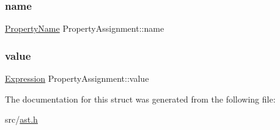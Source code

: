 \mbox{\label{struct_property_assignment_aef9a461cb355f88b21f339a613374bf0}} 
\subsubsection{\texorpdfstring{name}{name}}
{\footnotesize\ttfamily \hyperlink{ast_8h_a3a703c4a41dea6908048c9dd291d83b1}{Property\+Name} Property\+Assignment\+::name}

\mbox{\label{struct_property_assignment_ab246a5637430724d0532fc07d4f04462}} 
\subsubsection{\texorpdfstring{value}{value}}
{\footnotesize\ttfamily \hyperlink{ast_8h_a4cb273a4d960cd13ea17d08f254493e8}{Expression} Property\+Assignment\+::value}



The documentation for this struct was generated from the following file\+:\begin{DoxyCompactItemize}
\item 
src/\hyperlink{ast_8h}{ast.\+h}\end{DoxyCompactItemize}
